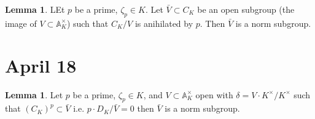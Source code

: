 \documentclass[12pt]{extarticle}
\theoremstyle{definition}
\newtheorem{lemma}[theorem]{Lemma}
\begin{document}
\begin{lemma}
LEt $p$ be a prime, $\zeta_p \in K$. Let $\bar{V} \subset C_K$ be an open subgroup (the image of $V \subset \mathbb{A}_K^\times$) such that $C_K / V$ is anihilated by $p$. Then $\bar{V}$ is a norm subgroup. 
\end{lemma}

\section{April 18}

\begin{lemma}
Let $p$ be a prime, $\zeta_p \in K$, and $V \subset \mathbb{A}_K^\times$ open with $\delta = V \cdot K^\times / K^\times$ such that $(C_K)^p \subset \bar{V}$ i.e. $p \cdot D_K / \bar{V} = 0$ then $\bar{V}$ is a norm subgroup. 
\end{lemma}
\end{document}
